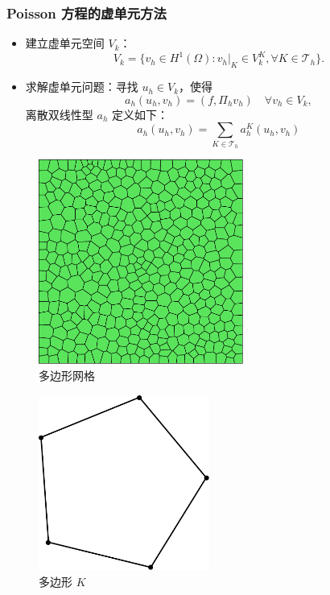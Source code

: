\documentclass[notheorems,serif]{beamer}
\begin{document}
\begin{frame}
    \frametitle{Poisson 方程的虚单元方法}
\begin{minipage}[b]{0.6\linewidth}
\begin{itemize}
\item 建立虚单元空间 $V_k$：
$$
V_k = \{v_h \in H^1(\Omega): v_h|_K \in V_k^K, \forall K \in
\mathcal{T}_h\}.
$$
\item 求解虚单元问题：寻找 $u_h \in V_k$，使得
$$
a_h(u_h, v_h) = (f, \Pi_hv_h) \quad \forall v_h \in V_k,
$$
离散双线性型 $a_h$ 定义如下：
$$
a_h(u_h, v_h) = \sum_{K \in \mathcal{T}_h} a_h^K(u_h, v_h) 
$$
\vspace{40pt}
\end{itemize}
\end{minipage}
\hfill
\begin{minipage}[b]{0.38\linewidth}
    \centering
    \begin{figure}[htpb]
        \centering
        \includegraphics[width=0.6\textwidth]{../figures/voronoi_quad.pdf}
        \caption{多边形网格}
    \end{figure}
    \begin{figure}[htpb]
        \centering
        \includegraphics[width=0.5\textwidth]{../figures/polygon.pdf}
        \caption{多边形 $K$}
    \end{figure}
\end{minipage}
\end{frame}
\end{document}
